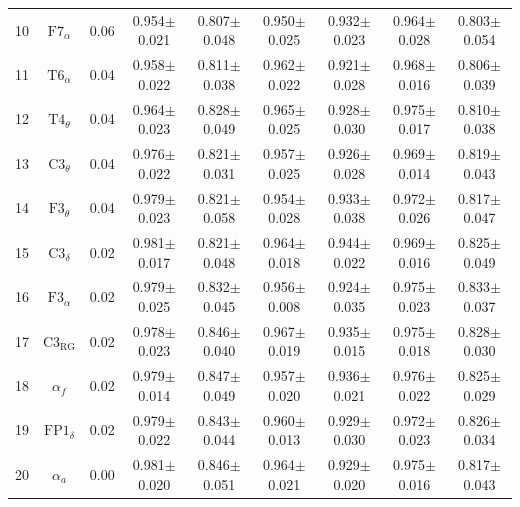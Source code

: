 \documentclass[pdflatex,sn-mathphys]{sn-jnl}%
\theoremstyle{thmstyleone}%
\theoremstyle{thmstyletwo}%
\theoremstyle{thmstylethree}%
\begin{document}
\begin{appendices}
\begin{table}[h!]
{\begin{tabular}{r|cccccccc}
  10 &          $\text{F7}_{\alpha}$ &   0.06 &          0.954$\pm$0.021 &          0.807$\pm$0.048 &          0.950$\pm$0.025 &          0.932$\pm$0.023 &          0.964$\pm$0.028 &          0.803$\pm$0.054 \\
  11 &          $\text{T6}_{\alpha}$ &   0.04 &          0.958$\pm$0.022 &          0.811$\pm$0.038 &          0.962$\pm$0.022 &          0.921$\pm$0.028 &          0.968$\pm$0.016 &          0.806$\pm$0.039 \\
  12 &          $\text{T4}_{\theta}$ &   0.04 &          0.964$\pm$0.023 &          0.828$\pm$0.049 &          0.965$\pm$0.025 &          0.928$\pm$0.030 &          0.975$\pm$0.017 &          0.810$\pm$0.038 \\
  13 &          $\text{C3}_{\theta}$ &   0.04 &          0.976$\pm$0.022 &          0.821$\pm$0.031 &          0.957$\pm$0.025 &          0.926$\pm$0.028 &          0.969$\pm$0.014 &          0.819$\pm$0.043 \\
  14 &          $\text{F3}_{\theta}$ &   0.04 &          0.979$\pm$0.023 &          0.821$\pm$0.058 &          0.954$\pm$0.028 &          0.933$\pm$0.038 &          0.972$\pm$0.026 &          0.817$\pm$0.047 \\
  15 &          $\text{C3}_{\delta}$ &   0.02 &          0.981$\pm$0.017 &          0.821$\pm$0.048 &          0.964$\pm$0.018 &          0.944$\pm$0.022 &          0.969$\pm$0.016 &          0.825$\pm$0.049 \\
  16 &          $\text{F3}_{\alpha}$ &   0.02 &          0.979$\pm$0.025 &          0.832$\pm$0.045 &          0.956$\pm$0.008 &          0.924$\pm$0.035 &          0.975$\pm$0.023 &          0.833$\pm$0.037 \\
  17 &       $\text{C3}_{\text{RG}}$ &   0.02 &          0.978$\pm$0.023 &          0.846$\pm$0.040 &          0.967$\pm$0.019 &          0.935$\pm$0.015 &          0.975$\pm$0.018 &          0.828$\pm$0.030 \\
  18 &                  $\alpha_{f}$ &   0.02 &          0.979$\pm$0.014 &          0.847$\pm$0.049 &          0.957$\pm$0.020 &          0.936$\pm$0.021 &          0.976$\pm$0.022 &          0.825$\pm$0.029 \\
  19 &         $\text{FP1}_{\delta}$ &   0.02 &          0.979$\pm$0.022 &          0.843$\pm$0.044 &          0.960$\pm$0.013 &          0.929$\pm$0.030 &          0.972$\pm$0.023 &          0.826$\pm$0.034 \\
  20 &                  $\alpha_{a}$ &   0.00 &          0.981$\pm$0.020 &          0.846$\pm$0.051 &          0.964$\pm$0.021 &          0.929$\pm$0.020 &          0.975$\pm$0.016 &          0.817$\pm$0.043 \\

\end{tabular}}
\end{table}
\end{appendices}
\end{document}
